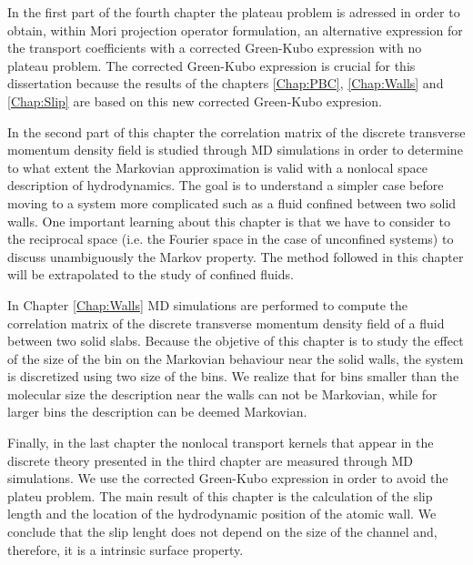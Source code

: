 \documentclass[b5paper,openright,10pt]{book}
\begin{document}
In the first part of the fourth chapter the plateau problem is adressed in order to obtain, within Mori projection operator formulation, an alternative expression for the transport coefficients with a corrected Green-Kubo expression with no plateau problem. 
The corrected Green-Kubo expression is crucial for this dissertation because the results of the chapters \ref{Chap:PBC}, \ref{Chap:Walls} and \ref{Chap:Slip} are based on this new corrected Green-Kubo expresion. 

In the second part of this chapter the correlation matrix of the discrete transverse momentum density field is studied through MD simulations in order to determine to what extent the Markovian approximation is valid with a nonlocal space description of hydrodynamics. 
The goal is to understand a simpler case before moving to a system more complicated such as a fluid confined between two solid walls. 
One important learning about this chapter is that we have to consider to the reciprocal space (i.e. the Fourier space in the case of unconfined systems) to discuss unambiguously the Markov property.
The method followed in this chapter will be extrapolated to the study of  confined fluids. 

In Chapter \ref{Chap:Walls} MD simulations are performed to compute the correlation matrix of the discrete transverse momentum density field of a fluid between two solid slabs. 
Because the objetive of this chapter is to study the effect of the size of the bin on the Markovian behaviour near the solid walls, the system is discretized using two size of the bins. We realize that for bins smaller than the molecular size the description near the walls can not be Markovian, while for larger bins the description can be deemed Markovian.  

Finally, in the last chapter  the nonlocal transport kernels that appear in the discrete theory presented in the third chapter are measured through MD simulations. 
We use the corrected Green-Kubo expression in order to avoid the plateu problem. 
The main result of this chapter is the calculation of the slip length and the location of the hydrodynamic position of the atomic wall. We conclude that the slip lenght does not depend on the size of the channel and, therefore, it is a intrinsic surface property.  
\end{document}
